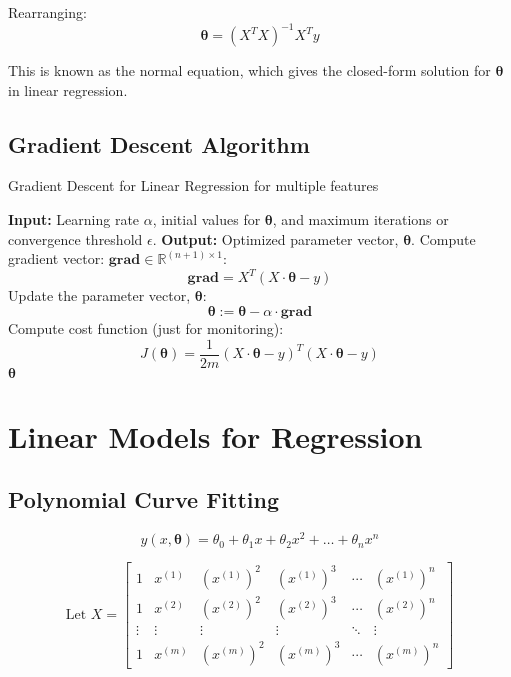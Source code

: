 Rearranging:
\begin{equation}
\boldsymbol{\theta} = (X^T X)^{-1} X^T y
\end{equation}

This is known as the normal equation, which gives the closed-form solution for \(\boldsymbol{\theta}\) in
linear regression.

\subsection{Gradient Descent Algorithm}

\begin{algorithm}[h!]
\caption{Gradient Descent for Linear Regression for multiple features}
\begin{algorithmic}[1]
\STATE \textbf{Input:} Learning rate $\alpha$, initial values for $\boldsymbol{\theta}$, and maximum iterations or
convergence threshold $\epsilon$.
\STATE \textbf{Output:} Optimized parameter vector, $\boldsymbol{\theta}$.
\REPEAT
    \STATE Compute gradient vector: $\textbf{grad} \in \mathbb{R}^{(n+1) \times 1}$:
    \[
        \textbf{grad} = X^T (X \cdot \boldsymbol{\theta} - y)
    \]
    \STATE Update the parameter vector, $\boldsymbol{\theta}$:
    \[
        \boldsymbol{\theta} := \boldsymbol{\theta} - \alpha \cdot \textbf{grad}
    \]
    \STATE Compute cost function (just for monitoring):
    \[
    J(\boldsymbol{\theta}) = \frac{1}{2m} (X \cdot \boldsymbol{\theta} - y)^T (X \cdot \boldsymbol{\theta} - y)
    \]
\RETURN $\boldsymbol{\theta}$
\end{algorithmic}
\end{algorithm}

\section{Linear Models for Regression}

\subsection{Polynomial Curve Fitting}

\begin{equation}
    \hat{y}(x, \boldsymbol{\theta}) = \theta_0 + \theta_1 x + \theta_2 x^2 + \dots + \theta_n x^n
\end{equation}

\begin{equation}
\text{Let } X =
\begin{bmatrix}
1 & x^{(1)} & (x^{(1)})^2 & (x^{(1)})^3 & \cdots & (x^{(1)})^n \\
1 & x^{(2)} & (x^{(2)})^2 & (x^{(2)})^3 & \cdots & (x^{(2)})^n \\
\vdots & \vdots & \vdots & \vdots & \ddots & \vdots \\
1 & x^{(m)} & (x^{(m)})^2 & (x^{(m)})^3 & \cdots & (x^{(m)})^n
\end{bmatrix}
\end{equation}



